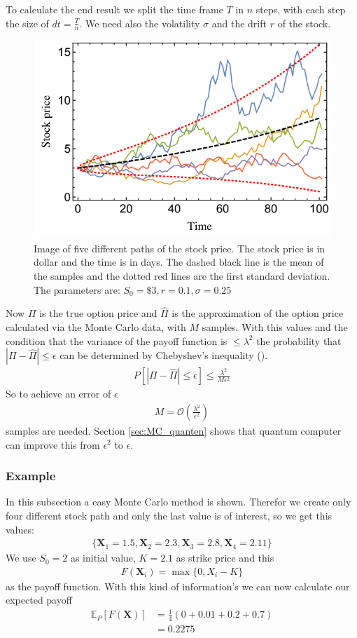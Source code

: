 \documentclass[a4paper, 12pt, one column, aas_macros]{article}
\begin{document}
To calculate the end result we split the time frame $T$ in $n$ steps, with each step the size of $dt=\frac{T}{n}$. We need also the volatility $\sigma$ and the drift $r$ of the stock.
\begin{figure}[H]
  \begin{center}
    \includegraphics[width=0.5\linewidth]{images/stock_path.png}
  \end{center}
  \caption{Image of five different paths of the stock price. The stock price is in dollar and the time is in days. The dashed black line is the mean of the samples and the dotted red lines are the first standard deviation. The parameters are: $S_0=\$3, r=0.1, \sigma=0.25$ \cite{1805.00109}}
  \label{fig:stockPaths}
\end{figure}
Now $\Pi$ is the true option price and $\hat{\Pi}$ is the approximation of the option price calculated via the Monte Carlo data, with $M$ samples. With this values and the condition that the variance of the payoff function is $ \leq \lambda^2$ the probability that $|\Pi-\hat{\Pi}| \leq \epsilon$ can be determined by Chebyshev’s inequality (\cite{1504.06987}).
\begin{align}
	        P[|\Pi-\hat{\Pi}| \leq \epsilon] \leq \frac{\lambda^2}{M\epsilon^2}
	    \end{align}
So to achieve an error of $\epsilon$
\begin{align}
	        M=\mathcal{O}(\frac{\lambda^2}{\epsilon^2}) \label{eq:classic_M}
	    \end{align}
samples are needed. Section \ref{sec:MC_quanten} shows that quantum computer can improve this from $\epsilon^2$ to $\epsilon$.

\subsubsection{Example} \label{seq:MC_example}
In this subsection a easy Monte Carlo method is shown. Therefor we create only four different stock path and only the last value is of interest, so we get this values:
\begin{align}
    \{\textbf{X}_1=1.5, \textbf{X}_2=2.3, \textbf{X}_3=2.8, \textbf{X}_4=2.11\} \nonumber
\end{align}
We use $S_0=2$ as initial value, $K=2.1$ as strike price and this
\begin{align}
    F(\textbf{X}_i) = \max\{0, X_i - K\} \label{eq:MC_example_european}
\end{align}
as the payoff function. With this kind of information's we can now calculate our expected payoff
\begin{align}
    \mathbb{E}_P[F(\textbf{X})] &= \frac{1}{4}(0+0.01+0.2+0.7 ) \nonumber \\
    &= 0.2275 \nonumber
\end{align}
\end{document}
